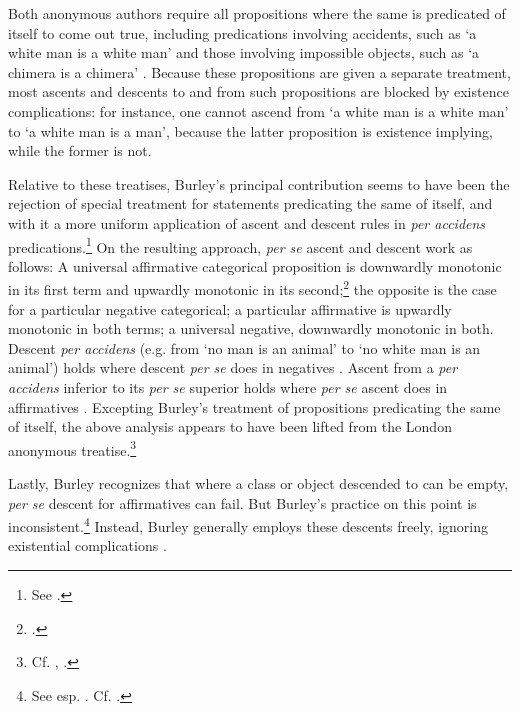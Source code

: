 \documentclass[]{article}
\begin{document}
Both anonymous authors require all propositions where the same is predicated of itself to come out true, including predications involving accidents, such as `a white man is a white man' and those involving impossible objects, such as `a chimera is a chimera' \cite[p. 8, par. 23; 11, par. 36-37; 18, par. 31-32]{Green-Pedersen1980a}. Because these propositions are given a separate treatment, most ascents and descents to and from such propositions are blocked by existence complications: for instance, one cannot ascend from `a white man is a white man' to `a white man is a man', because the latter proposition is existence implying, while the former is not. 

Relative to these treatises, Burley's principal contribution seems to have been the rejection of special treatment for statements predicating the same of itself, and with it a more uniform application of ascent and descent rules in \textit{per accidens} predications.\footnote{See \cite[pp. 116-117, par. 19-20; 134, par. 95; p. 158, par. 160.]{Green-Pedersen1980b}.} On the resulting approach, \textit{per se} ascent and descent work as follows: A universal affirmative categorical proposition is downwardly monotonic in its first term and upwardly monotonic in its second;\footnote{\cite[p. 211.16-20]{BurleyDPAL}.} the opposite is the case for a particular negative categorical; a particular affirmative is upwardly monotonic in both terms; a universal negative, downwardly monotonic in both. Descent \textit{per accidens} (e.g. from `no man is an animal' to `no white man is an animal') holds where descent \textit{per se} does in negatives \cite[pp. 209.35-210.10]{BurleyDPAL}. Ascent from a \textit{per accidens} inferior to its \textit{per se} superior holds where \textit{per se} ascent does in affirmatives \cite[pp. 116-117, par. 20]{Green-Pedersen1980b}. Excepting Burley's treatment of propositions predicating the same of itself, the above analysis appears to have been lifted from the London anonymous treatise.\footnote{Cf. \cite[pp. 10-11, par. 35-37]{Green-Pedersen1980a}, \cite[pp. 116-117, par. 19-20]{Green-Pedersen1980b}.} 

Lastly, Burley recognizes that where a class or object descended to can be empty, \textit{per se} descent for affirmatives can fail. But Burley's practice on this point is inconsistent.\footnote{See esp. \cite[pp. 61.4, 85.16; 85.4, 211.27-28]{BurleyDPAL}. Cf. \cite{Mora-Marquez2015}.} Instead, Burley generally employs these descents freely, ignoring existential complications \cite[pp. 23.26, 26.26, 31.21, 67.19, 67.30, 85.16, 85.26, 211.27-28]{BurleyDPAL}.
\end{document}

